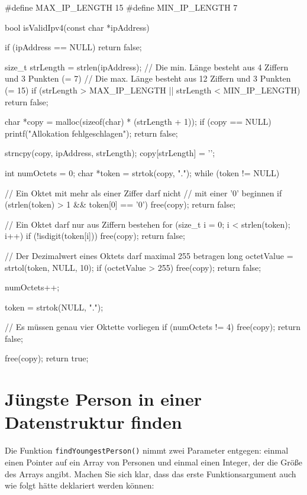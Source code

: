 \begin{codebox}[lang=c, fontsize=\small]
#define MAX_IP_LENGTH 15
#define MIN_IP_LENGTH 7

bool isValidIpv4(const char *ipAddress) {
    if (ipAddress == NULL)
        return false;

    size_t strLength = strlen(ipAddress);
    // Die min. Länge besteht aus  4 Ziffern und 3 Punkten (= 7)
    // Die max. Länge besteht aus 12 Ziffern und 3 Punkten (= 15)
    if (strLength > MAX_IP_LENGTH || strLength < MIN_IP_LENGTH)
        return false;

    char *copy = malloc(sizeof(char) * (strLength + 1));
    if (copy == NULL) {
        printf("Allokation fehlgeschlagen\n");
        return false;
    }

    strncpy(copy, ipAddress, strLength);
    copy[strLength] = '\0';

    int numOctets = 0;
    char *token = strtok(copy, ".");
    while (token != NULL) {
        // Ein Oktet mit mehr als einer Ziffer darf nicht
        // mit einer '0' beginnen
        if (strlen(token) > 1 && token[0] == '0') {
            free(copy);
            return false;
        }

        // Ein Oktet darf nur aus Ziffern bestehen
        for (size_t i = 0; i < strlen(token); i++) {
            if (!isdigit(token[i])) {
                free(copy);
                return false;
            }
        }

        // Der Dezimalwert eines Oktets darf maximal 255 betragen
        long octetValue = strtol(token, NULL, 10);
        if (octetValue > 255) {
            free(copy);
            return false;
        }

        numOctets++;

        token = strtok(NULL, ".");
    }

    // Es müssen genau vier Oktette vorliegen
    if (numOctets != 4) {
        free(copy);
        return false;
    }

    free(copy);
    return true;
}
\end{codebox}




\chapter{Jüngste Person in einer Datenstruktur finden}

Die Funktion \texttt{findYoungestPerson()} nimmt zwei Parameter entgegen:
einmal einen Pointer auf ein Array von Personen und einmal einen Integer, der
die Größe des Arrays angibt. Machen Sie sich klar, dass das erste
Funktionsargument auch wie folgt hätte deklariert werden können:

